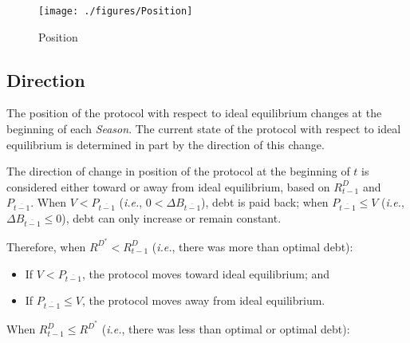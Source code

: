 \documentclass[tikz]{article}
\newcommand{\term}[1]{\textsl{#1}}
\begin{document}

\begin{figure}[h!]
    \centering
    \texttt{[image: ./figures/Position]} %
    \caption{Position}
    \label{Position}
\end{figure}


\subsection{Direction}
\vspace{0.1cm}

The position of the protocol with respect to ideal equilibrium changes at the beginning of each \term{Season}. The current state of the protocol with respect to ideal equilibrium is determined in part by the direction of this change. 

\vspace{0.1cm}

The direction of change in position of the protocol at the beginning of $t$ is considered either toward or away from ideal equilibrium, based on $R_{t-1}^{D}$ and $P_{\overline{t-1}}$. When $V < P_{\overline{t-1}}$ (\textit{i.e.}, $0 < \Delta B_{\overline{t-1}}$), debt is paid back; when $P_{\overline{t-1}} \leq V$ (\textit{i.e.}, $\Delta B_{\overline{t-1}} \leq 0$), debt can only increase or remain constant.

\vspace{0.1cm}

Therefore, when $R^{D^{*}} < R_{t-1}^{D}$ (\textit{i.e.}, there was more than optimal debt):

\vspace{0.1cm}

\begin{itemize}[topsep=0pt, itemsep=1pt]
    \item If $V < P_{\overline{t-1}}$, the protocol moves toward ideal equilibrium; and \vspace{0.1cm}
    \item If $P_{\overline{t-1}} \leq V$, the protocol moves away from ideal equilibrium.
\end{itemize}

\vspace{0.1cm}

When $R_{t-1}^{D} \leq R^{D^{*}}$ (\textit{i.e.}, there was less than optimal or optimal debt):
\end{document}
